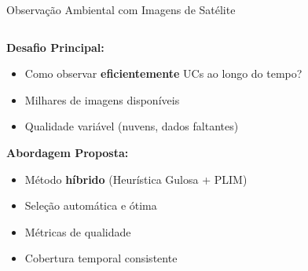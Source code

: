 \documentclass[aspectratio=169,11pt]{beamer}
\begin{document}
\begin{frame}{Observação Ambiental com Imagens de Satélite}
\vspace{-0.3cm}
\begin{columns}[T]
    \begin{column}{0.6\textwidth}
        \textbf{\color{ufal}Desafio Principal:}
        \begin{itemize}
            \item Como observar \textbf{eficientemente} UCs ao longo do tempo?
            \item Milhares de imagens disponíveis
            \item Qualidade variável (nuvens, dados faltantes)
        \end{itemize}
        
        \vspace{0.4cm}
        \textbf{\color{success}Abordagem Proposta:}
        \begin{itemize}
            \item Método \textbf{híbrido} (Heurística Gulosa + PLIM)
            \item Seleção automática e ótima
            \item Métricas de qualidade
            \item Cobertura temporal consistente
        \end{itemize}
    \end{column}
    \begin{column}{0.35\textwidth}
    \end{column}
\end{columns}
\end{frame}
\end{document}
